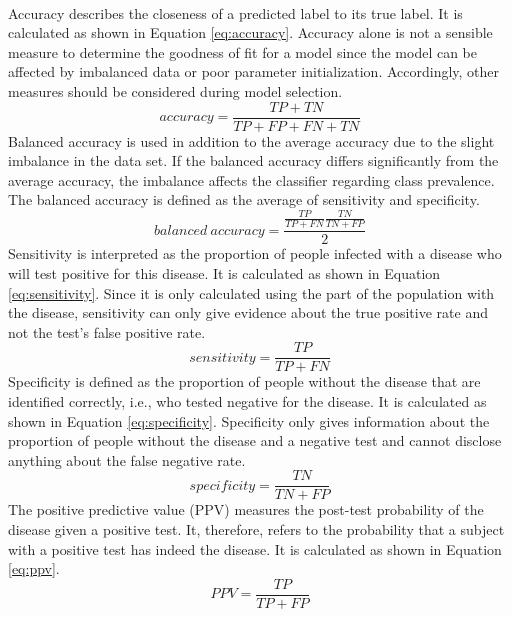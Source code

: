 \\
Accuracy describes the closeness of a predicted label to its true 
label. It is calculated as shown in Equation \ref{eq:accuracy}. Accuracy alone 
is not a sensible measure to determine the goodness of fit for a model since 
the model can be affected by imbalanced data or poor parameter initialization. 
Accordingly, other measures should be considered during model 
selection.\cite{RN167}
\begin{equation}
 accuracy = \frac{TP + TN}{TP+FP+FN+TN}
 \label{eq:accuracy}
\end{equation}
Balanced accuracy is used in addition to the average accuracy due to the slight 
imbalance in the data set. If the balanced accuracy differs significantly from 
the average accuracy, the imbalance affects the classifier regarding 
class prevalence. The balanced accuracy is defined as the average of 
sensitivity and specificity. \cite{RN167, RN127}
\begin{equation}
 balanced \ accuracy = \frac{\frac{TP}{TP+FN}\frac{TN}{TN+FP}}{2}
 \label{eq:balanced_acc}
\end{equation}
Sensitivity is interpreted as the proportion of people infected with a disease 
who will test positive for this disease. It is calculated as shown in Equation 
\ref{eq:sensitivity}. Since it is only calculated using the part of the 
population with the disease, sensitivity can only give evidence about the true 
positive rate and not the test's false positive rate.\cite{RN168}
\begin{equation}
 sensitivity = \frac{TP}{TP+FN}
 \label{eq:sensitivity}
\end{equation}
Specificity is defined as the proportion of people without the disease that are 
identified correctly, i.e., who tested negative for the disease. It is 
calculated as shown in Equation \ref{eq:specificity}. Specificity only gives 
information about the proportion of people without the disease and a negative 
test and cannot disclose anything about the false negative 
rate.\cite{RN168}
\begin{equation}
 specificity = \frac{TN}{TN+FP}
 \label{eq:specificity}
\end{equation}
The positive predictive value (PPV) measures the post-test probability of the 
disease given a positive test. It, therefore, refers to the probability that a 
subject with a positive test has indeed the disease. It is calculated as shown 
in 
Equation \ref{eq:ppv}.\cite{RN168}
\begin{equation}
 PPV = \frac{TP}{TP+FP}
 \label{eq:ppv}
\end{equation}
